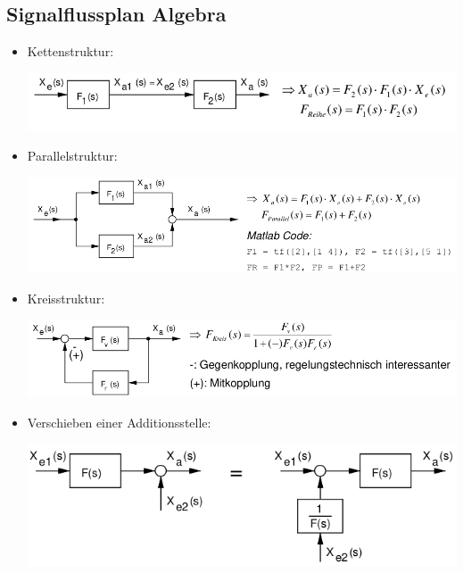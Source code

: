 \documentclass[10pt,a4paper]{article}
\begin{document}
\subsection{Signalflussplan Algebra}
\begin{itemize}[leftmargin=*]
	\item Kettenstruktur:
	      \begin{center}
		      \includegraphics[width=0.96\columnwidth]{Figures/Kettenstruktur.png}
	      \end{center}

	\item Parallelstruktur:
	      \begin{center}
		      \includegraphics[width=0.96\columnwidth]{Figures/Parallelstruktur.png}
	      \end{center}

	\item Kreisstruktur:
	      \begin{center}
		      \includegraphics[width=0.96\columnwidth]{Figures/Kreisstruktur.png}
	      \end{center}

	\item Verschieben einer Additionsstelle:
	      \begin{center}
		      \includegraphics[width=0.9\columnwidth]{Figures/Verschiebung einer Additionsstelel.png}
	      \end{center}


\end{itemize}
\end{document}
